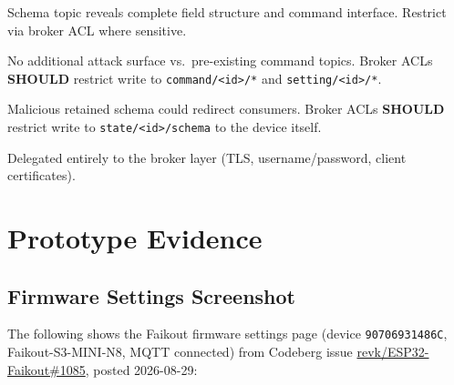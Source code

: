 \documentclass[11pt,a4paper]{article}
\newcommand{\should}{\textbf{SHOULD}}
\newcommand{\topic}[1]{\texttt{\color{accent}#1}}
\begin{document}
\begin{description}[leftmargin=3cm, style=nextline]
  \item[Information Disclosure] Schema topic reveals complete field structure and command interface. Restrict via broker ACL where sensitive.
  \item[Command Injection] No additional attack surface vs.\ pre-existing command topics. Broker ACLs \should{} restrict write to \topic{command/\textless id\textgreater/*} and \topic{setting/\textless id\textgreater/*}.
  \item[Schema Spoofing] Malicious retained schema could redirect consumers. Broker ACLs \should{} restrict write to \topic{state/\textless id\textgreater/schema} to the device itself.
  \item[Authentication] Delegated entirely to the broker layer (TLS, username/password, client certificates).
\end{description}

\newpage
\appendix

\section{Prototype Evidence}
\label{app:prototype}

\subsection{Firmware Settings Screenshot}

The following shows the Faikout firmware settings page (device \texttt{90706931486C}, Faikout-S3-MINI-N8, MQTT connected) from Codeberg issue \href{https://codeberg.org/revk/ESP32-Faikout/issues/1085}{revk/ESP32-Faikout\#1085}, posted 2026-08-29:
\end{document}
